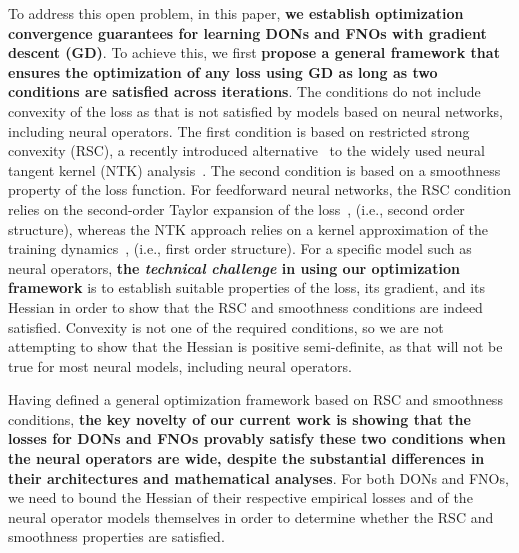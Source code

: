 To address this open problem, in this paper, \textbf{we establish  optimization convergence guarantees for learning DONs and FNOs with gradient descent (GD)}.
To achieve this, we first \textbf{propose a general framework that ensures the optimization of any loss using GD as long as two conditions are satisfied across iterations}. The conditions do not include convexity of the loss as that is not satisfied by models based on neural networks, including neural operators.
%
The first condition is based on restricted strong convexity (RSC), a recently introduced alternative~\citep{banerjee2022restricted} to the widely used neural tangent kernel (NTK) analysis~\citep{liu_linearity_2021,liu2022loss,allen-zhu_convergence_2019}. 
The second condition is based on a smoothness property of the loss function. For feedforward neural networks, the RSC condition relies on the second-order Taylor expansion of the loss~\citep{banerjee2022restricted,cisnerosvelarde2024optgenWeightNorm},  (i.e., second order structure), whereas the NTK approach relies on a kernel approximation of the training dynamics~\citep{jacot2018neural},  (i.e., first order structure).
%
For a specific model such as neural operators, \textbf{the \emph{technical challenge} in using our optimization framework} is to establish suitable properties of the loss, its gradient, and its Hessian in order to show that the RSC and smoothness conditions are indeed satisfied. Convexity is not one of the required conditions, so we are not attempting to show that the Hessian is positive semi-definite, as that will not be true for most neural models, including neural operators. 
  
%

Having defined a general optimization framework based on RSC and smoothness conditions, 
\textbf{the key novelty 
of our current work is showing that the losses for DONs and FNOs 
provably satisfy these two conditions when the neural operators are wide, despite the substantial differences in their architectures and mathematical analyses}. 
%
For both DONs and FNOs, we need to bound the Hessian of their respective empirical losses
and of the neural operator models themselves in order to 
determine whether the RSC and smoothness properties are satisfied. 


